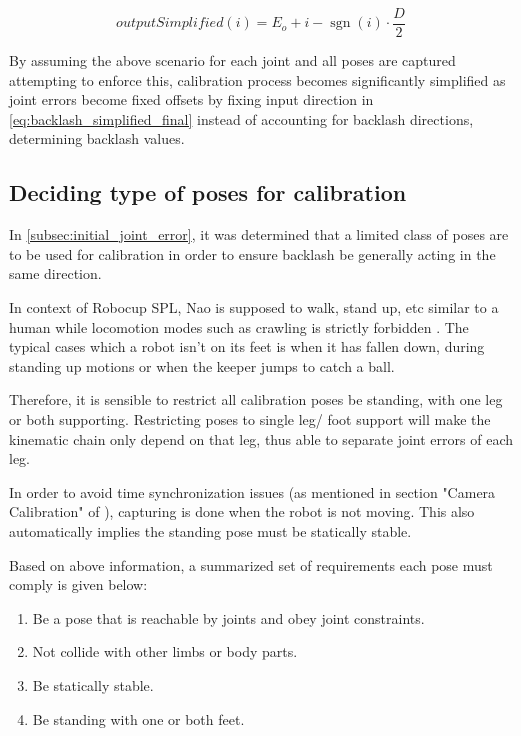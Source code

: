 \documentclass[english, printversion, nomenclature, notitle]{tuvisionthesis} %
\DeclareMathOperator{\sgn}{sgn}
\begin{document}
\begin{equation}
outputSimplified(i) = E_o + i -\sgn(i)\cdot\frac{D}{2}
\label{eq:backlash_simplified_final}
\end{equation}

By assuming the above scenario for each joint and all poses are captured attempting to enforce this, calibration process becomes significantly simplified as joint errors become fixed offsets by fixing input direction in \cref{eq:backlash_simplified_final} instead of accounting for backlash directions, determining backlash values.

\subsection{Deciding type of poses for calibration}

In \cref{subsec:initial_joint_error}, it was determined that a limited class of poses are to be used for calibration in order to ensure backlash be generally acting in the same direction.

In context of Robocup SPL, Nao is supposed to walk, stand up, etc similar to a human while locomotion modes such as crawling is strictly forbidden \cite{robocup_technical_committee_robocup_2018}. The typical cases which a robot isn't on its feet is when it has fallen down, during standing up motions or when the keeper jumps to catch a ball.

Therefore, it is sensible to restrict all calibration poses be standing, with one leg or both supporting. Restricting poses to single leg/ foot support will make the kinematic chain only depend on that leg, thus able to separate joint errors of each leg.

In order to avoid time synchronization issues (as mentioned in section "Camera Calibration" of \cite{darshana_adikari_team_2017}), capturing is done when the robot is not moving. This also automatically implies the standing pose must be statically stable.

Based on above information, a summarized set of requirements each pose must comply is given below:
\begin{enumerate}
	\label{items:conditionsForPose}
	\item Be a pose that is reachable by joints and obey joint constraints.
	\item Not collide with other limbs or body parts.
	\item Be statically stable.
	\item Be standing with one or both feet.
\end{enumerate}
\end{document}
